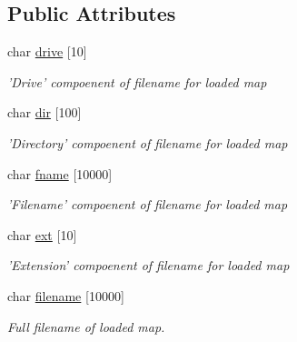 \subsection*{Public Attributes}
\begin{DoxyCompactItemize}
\item 
\hypertarget{class_geomap3_d_ae50f7463da500b5d345fd54f4a8afff0}{
char \hyperlink{class_geomap3_d_ae50f7463da500b5d345fd54f4a8afff0}{drive} \mbox{[}10\mbox{]}}
\label{class_geomap3_d_ae50f7463da500b5d345fd54f4a8afff0}

\begin{DoxyCompactList}\small\item\em 'Drive' compoenent of filename for loaded map \end{DoxyCompactList}\item 
\hypertarget{class_geomap3_d_abb959f8d27639abfb99c17a2a8d07d45}{
char \hyperlink{class_geomap3_d_abb959f8d27639abfb99c17a2a8d07d45}{dir} \mbox{[}100\mbox{]}}
\label{class_geomap3_d_abb959f8d27639abfb99c17a2a8d07d45}

\begin{DoxyCompactList}\small\item\em 'Directory' compoenent of filename for loaded map \end{DoxyCompactList}\item 
\hypertarget{class_geomap3_d_a51e3d41bd09fbb3116f084d5789a4249}{
char \hyperlink{class_geomap3_d_a51e3d41bd09fbb3116f084d5789a4249}{fname} \mbox{[}10000\mbox{]}}
\label{class_geomap3_d_a51e3d41bd09fbb3116f084d5789a4249}

\begin{DoxyCompactList}\small\item\em 'Filename' compoenent of filename for loaded map \end{DoxyCompactList}\item 
\hypertarget{class_geomap3_d_a049d569e836760fd87f1ac5bd1465ad6}{
char \hyperlink{class_geomap3_d_a049d569e836760fd87f1ac5bd1465ad6}{ext} \mbox{[}10\mbox{]}}
\label{class_geomap3_d_a049d569e836760fd87f1ac5bd1465ad6}

\begin{DoxyCompactList}\small\item\em 'Extension' compoenent of filename for loaded map \end{DoxyCompactList}\item 
\hypertarget{class_geomap3_d_a8e785ac77abeff79a67041c81438b65a}{
char \hyperlink{class_geomap3_d_a8e785ac77abeff79a67041c81438b65a}{filename} \mbox{[}10000\mbox{]}}
\label{class_geomap3_d_a8e785ac77abeff79a67041c81438b65a}

\begin{DoxyCompactList}\small\item\em Full filename of loaded map. \end{DoxyCompactList}\end{DoxyCompactItemize}

